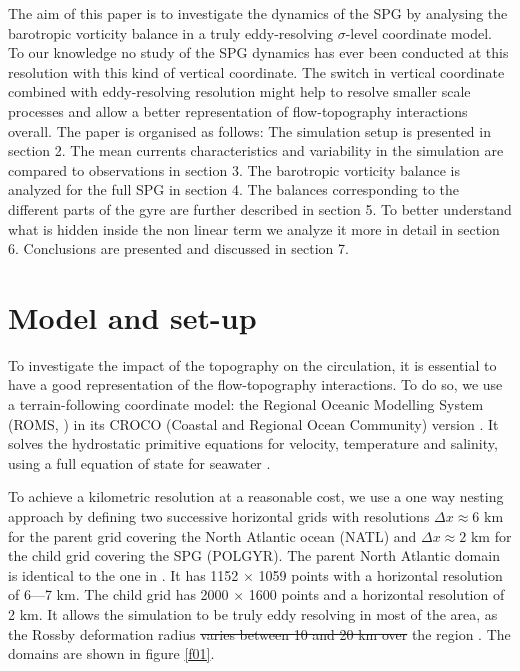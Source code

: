 \documentclass[os, manuscript]{copernicus}
\providecommand{\DIFadd}[1]{{\protect\color{blue}\uwave{#1}}} %
\providecommand{\DIFdel}[1]{{\protect\color{red}\sout{#1}}}                      %
\providecommand{\DIFaddbegin}{} %
\providecommand{\DIFaddend}{} %
\providecommand{\DIFdelbegin}{} %
\providecommand{\DIFdelend}{} %
\begin{document}
The aim of this paper is to investigate the dynamics of the SPG by analysing the barotropic vorticity balance in a truly eddy-resolving $\sigma$-level coordinate model. To our knowledge no study of the SPG dynamics has ever been conducted at this resolution with this kind of vertical coordinate. The switch in vertical coordinate combined with eddy-resolving resolution might help to resolve smaller scale processes and allow a better representation of flow-topography interactions overall. The paper is organised as follows: The simulation setup is presented in section 2. The mean currents characteristics and variability in the simulation are compared to observations in section 3. The barotropic vorticity balance is analyzed for the full SPG in section 4. The balances corresponding to the different parts of the gyre are further described in section 5. To better understand what is hidden inside the non linear term we analyze it more in detail in section 6. Conclusions are presented and discussed in section 7.  

\section{Model and set-up}
To investigate the impact of the topography on the circulation, it is essential to have a good representation of the flow-topography interactions. To do so, we use a terrain-following coordinate model: the Regional Oceanic Modelling System (ROMS, \citet{shchepetkin2009}) in its CROCO (Coastal and Regional Ocean Community) version \citep{debreu2012}. It solves the hydrostatic primitive equations for velocity, temperature and salinity, using a full equation of state for seawater \citep{shchepetkin2009,shchepetkin2011}. 

To achieve a kilometric resolution at a reasonable cost, we use a one way nesting approach by defining two successive horizontal grids with resolutions $\Delta x \approx 6$ km for the parent grid covering the North Atlantic ocean (NATL) and $\Delta x \approx 2$ km for the child grid covering the SPG (POLGYR). The parent North Atlantic domain is identical to the one in \cite{renault2016}. It has 1152 $\times$ 1059 points  with a horizontal resolution of 6---7 km. The child grid has 2000 $\times$ 1600 points and a horizontal resolution of 2 km. It allows the simulation to be truly eddy resolving in most of the area, as the \DIFaddbegin \DIFadd{first }\DIFaddend Rossby deformation radius \DIFdelbegin \DIFdel{varies between 10 and 20 km over }\DIFdelend \DIFaddbegin \DIFadd{has trouble exceeding 10-km over most of }\DIFaddend the region \citep{chelton1998}. The domains are shown in figure \ref{f01}. 
\end{document}
